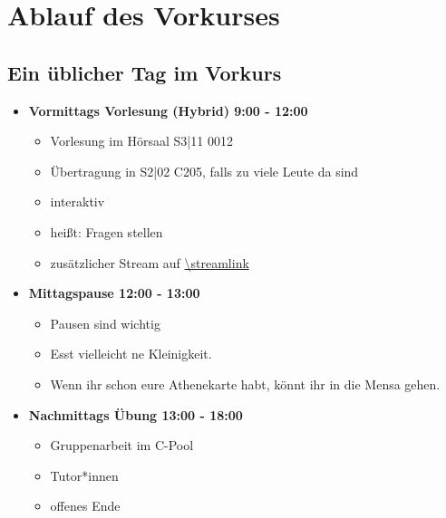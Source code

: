 \section{Ablauf des Vorkurses}
\subsection{Ein üblicher Tag im Vorkurs}
\begin{frame}
    \slidehead
    \begin{itemize}
        \item \textbf{Vormittags Vorlesung (Hybrid) 9:00 - 12:00}
            \begin{itemize}
                \item Vorlesung im Hörsaal S3|11 0012
                \item Übertragung in S2|02 C205, falls zu viele Leute da sind
                \item interaktiv
                \item heißt: Fragen stellen
                \item zusätzlicher Stream auf \url{\streamlink}
            \end{itemize}
            \pause
        \item \textbf{Mittagspause 12:00 - 13:00}
            \begin{itemize}
                \item Pausen sind wichtig
                \item Esst vielleicht ne Kleinigkeit.
                \item Wenn ihr schon eure Athenekarte habt, könnt ihr in die Mensa gehen.
            \end{itemize}
            \pause
        \item \textbf{Nachmittags Übung 13:00 - 18:00}
            \begin{itemize}
                \item Gruppenarbeit im C-Pool
                \item Tutor*innen
                \item offenes Ende
            \end{itemize}
    \end{itemize}
\end{frame}

